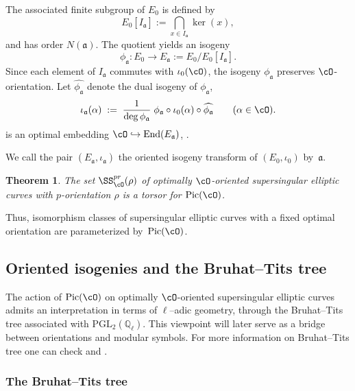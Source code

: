 \documentclass[10pt]{amsart}
\theoremstyle{theostyle}
\newtheorem{theorem}{Theorem}
\newcommand{\QQ}{\mathbb{Q}} \newcommand{\RR}{\mathbb{R}}
\renewcommand{\fa}{\mathfrak{a}} \newcommand{\fb}{\mathfrak{b}} \newcommand{\fc}{\mathfrak{c}}
\newcommand{\End}{\mathrm{End}}
\newcommand{\Pic}{\mathrm{Pic}}
\begin{document}
The associated finite subgroup of $E_0$ is defined by
\[
E_0[I_\fa] := \bigcap_{x\in I_\fa} \ker(x),
\]
and has order $N(\fa)$.
The quotient yields an isogeny
\begin{equation}\label{eq:phi_a}
	\phi_\fa : E_0 \longrightarrow E_\fa := E_0/E_0[I_\fa].
\end{equation}
Since each element of $I_\fa$ commutes with $\iota_0(\cO)$, the
isogeny $\phi_\fa$ preserves $\cO$-orientation. Let $\widehat{\phi_\fa}$ denote the dual isogeny of $\phi_\fa$,
\begin{equation}\label{eq:orientation-induced}
	\iota_\fa(\alpha) \;:=\; \frac{1}{\deg\phi_\fa}\; \phi_\fa \circ \iota_0(\alpha) \circ \widehat{\phi_\fa}
	\qquad (\alpha\in\cO).
\end{equation}
is an optimal embedding $\cO\hookrightarrow \End(E_\fa)$, \cite{Deuring,Kohel1996}.

We call the pair $(E_\fa,\iota_\fa)$ the oriented isogeny transform
of $(E_0,\iota_0)$ by~$\fa$.

\begin{theorem}
	\label{thm:Pic-torsor}
The set $\SS^{pr}_{\cO}(\rho)$ of optimally $\cO$-oriented supersingular
	elliptic curves with $p$-orientation $\rho$ is a torsor for
	$\Pic(\cO)$.
\end{theorem}

Thus, isomorphism classes of supersingular elliptic curves with a fixed optimal
orientation are parameterized by~$\Pic(\cO)$.
\color{black}



\subsection{Oriented isogenies and the Bruhat--Tits tree}
\label{subsec:BT-tree}

The action of $\Pic(\cO)$ on optimally $\cO$-oriented supersingular elliptic
curves admits an interpretation in terms of $\ell$--adic geometry, through the
Bruhat--Tits tree associated with $\mathrm{PGL}_2(\QQ_\ell)$.
This viewpoint will later serve as a bridge between orientations and modular
symbols. For more information on Bruhat--Tits tree one can check \cite{Iezzi:BTTrees} and \cite{BT:Book}.

\subsubsection*{The Bruhat--Tits tree}
\end{document}
